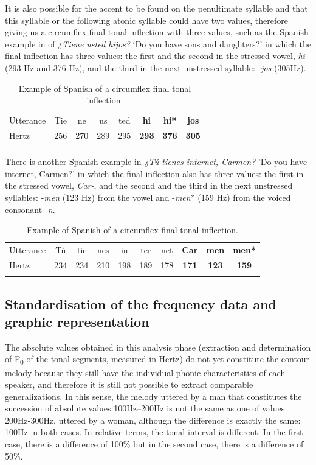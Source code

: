\documentclass[output=paper]{langscibook}
\begin{document}
It is also possible for the accent to be found on the penultimate syllable and that this syllable or the following atonic syllable could have two values, therefore giving us a circumflex final tonal inflection with three values, such as the Spanish example in  of \textit{¿Tiene usted hijos?} ‘Do you have sons and daughters?' in which the final inflection has three values: the first and the second in the stressed vowel, \textit{hi-} (293 Hz and 376 Hz), and the third in the next unstressed syllable: -\textit{jos} (305Hz).

\begin{table}
\begin{tabularx}{\textwidth}{X*{7}{c}}
\lsptoprule
Utterance & {Tie} & {ne} & {us} & {ted} & {\textbf{hi}} & {\textbf{hi*}} & {\textbf{jos}}\\
Hertz & 256 & 270 & 289 & 295 & \textbf{293} & \textbf{376} & \textbf{305}\\
\lspbottomrule
\end{tabularx}
\caption{\label{tab:font:4}Example of Spanish of a circumflex final tonal inflection.}
\end{table}

There is another Spanish example in  \textit{¿Tú tienes internet, Carmen?} 'Do you have internet, Carmen?' in which the final inflection also has three values: the first in the stressed vowel, \textit{Car-}, and the second and the third in the next unstressed syllables: -\textit{men} (123 Hz) from the vowel and -\textit{men}* (159 Hz) from the voiced consonant \textit{-n}.

\begin{table}
\begin{tabularx}{\textwidth}{X*{9}{c}}
\lsptoprule
Utterance & {Tú} & {tie} & {nes} & {in} & {ter} & {net} & {\textbf{Car}} & {\textbf{men}} & {\textbf{men*}}\\
Hertz & 234 & 234 & 210 & 198 & 189 & 178 & \textbf{171} & \textbf{123} & \textbf{159}\\
\lspbottomrule
\end{tabularx}
\caption{\label{tab:font:5}Example of Spanish of a circumflex final tonal inflection.}
\end{table}

\subsection{Standardisation of the frequency data and graphic representation} 
The absolute values obtained in this analysis phase (extraction and determination of F\textsubscript{0} of the tonal segments, measured in Hertz) do not yet constitute the contour melody because they still have the individual phonic characteristics of each speaker, and therefore it is still not possible to extract comparable generalizations. In this sense, the melody uttered by a man that constitutes the succession of absolute values 100Hz–200Hz is not the same as one of values 200Hz-300Hz, uttered by a woman, although the difference is exactly the same: 100Hz in both cases. In relative terms, the tonal interval is different. In the first case, there is a difference of 100\% but in the second case, there is a difference of 50\%. 
\end{document}
